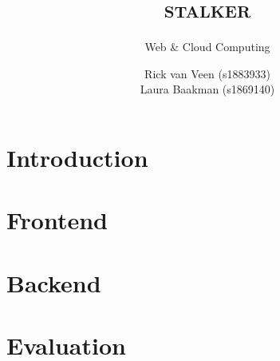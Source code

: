 \documentclass{report}
\title{\textsc{stalker}}
\subtitle{Web \& Cloud Computing}
\author{Rick van Veen (s1883933)\\Laura Baakman (s1869140)}
\begin{document}
\maketitle

\chapter*{Introduction}


\chapter{Frontend}


\chapter{Backend}


\chapter{Evaluation}

\end{document}
